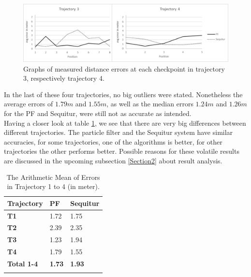 \begin{figure}[th]
\centering
\includegraphics[width=1.0\textwidth]{Figures/trajectory3_4_results}
\decoRule
\caption[Localization Results of Trajectory 3 and 4]{Graphs of measured distance errors at each checkpoint in trajectory 3, respectively trajectory 4.}
\label{fig:trajectory3and4_results}
\end{figure}In the last of these four trajectories, no big outliers were stated. Nonetheless the average errors of $1.79m$ and $1.55m$, as well as the median errors $1.24m$ and $1.26m$ for the PF and Sequitur, were still not as accurate as intended.\\
\noindent\hspace*{5mm}%
Having a closer look at table \ref{tab:arithmetic_errors}, we see that there are very big differences between different trajectories. The particle filter and the Sequitur system have similar accuracies, for some trajectories, one of the algorithms is better, for other trajectories the other performs better. Possible reasons for these volatile results are discussed in the upcoming subsection  \ref{Section2} about result analysis. 

\begin{table}
\caption{The Arithmetic Mean of Errors in Trajectory 1 to 4 (in meter).}
\label{tab:arithmetic_errors}
\centering
\begin{tabular}{l l l}
\toprule
\textbf{Trajectory} & \textbf{PF} & \textbf{Sequitur}\\
\midrule
\textbf{T1} & 1.72 & 1.75\\
\textbf{T2} & 2.39 & 2.35\\
\textbf{T3} & 1.23 & 1.94\\
\textbf{T4} & 1.79 & 1.55\\
\midrule
\textbf{Total 1-4}  & \textbf{1.73} & \textbf{1.93}\\
\bottomrule\\
\end{tabular}
\end{table}


